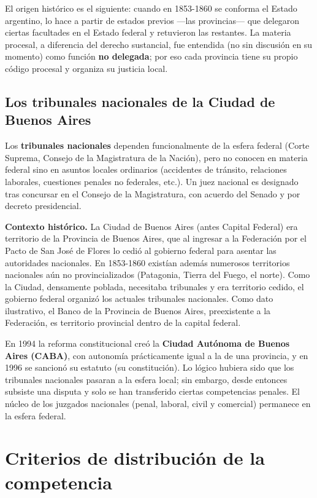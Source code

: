 \documentclass[12pt,oneside]{book}
\begin{document}
El origen histórico es el siguiente: cuando en 1853-1860 se conforma el Estado argentino, lo hace a partir de estados previos ---las provincias--- que delegaron ciertas facultades en el Estado federal y retuvieron las restantes. La materia procesal, a diferencia del derecho sustancial, fue entendida (no sin discusión en su momento) como función \textbf{no delegada}; por eso cada provincia tiene su propio código procesal y organiza su justicia local.

\subsection{Los tribunales nacionales de la Ciudad de Buenos Aires}

Los \textbf{tribunales nacionales} dependen funcionalmente de la esfera federal (Corte Suprema, Consejo de la Magistratura de la Nación), pero no conocen en materia federal sino en asuntos locales ordinarios (accidentes de tránsito, relaciones laborales, cuestiones penales no federales, etc.). Un juez nacional es designado tras concursar en el Consejo de la Magistratura, con acuerdo del Senado y por decreto presidencial.

\begin{note}
\textbf{Contexto histórico.} La Ciudad de Buenos Aires (antes Capital Federal) era territorio de la Provincia de Buenos Aires, que al ingresar a la Federación por el Pacto de San José de Flores lo cedió al gobierno federal para asentar las autoridades nacionales. En 1853-1860 existían además numerosos territorios nacionales aún no provincializados (Patagonia, Tierra del Fuego, el norte). Como la Ciudad, densamente poblada, necesitaba tribunales y era territorio cedido, el gobierno federal organizó los actuales tribunales nacionales. Como dato ilustrativo, el Banco de la Provincia de Buenos Aires, preexistente a la Federación, es territorio provincial dentro de la capital federal.
\end{note}

En 1994 la reforma constitucional creó la \textbf{Ciudad Autónoma de Buenos Aires (CABA)}, con autonomía prácticamente igual a la de una provincia, y en 1996 se sancionó su estatuto (su constitución). Lo lógico hubiera sido que los tribunales nacionales pasaran a la esfera local; sin embargo, desde entonces subsiste una disputa y solo se han transferido ciertas competencias penales. El núcleo de los juzgados nacionales (penal, laboral, civil y comercial) permanece en la esfera federal.

\section{Criterios de distribución de la competencia}
\end{document}

